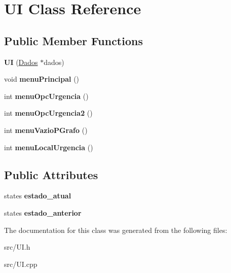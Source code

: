 \hypertarget{class_u_i}{}\section{UI Class Reference}
\label{class_u_i}
\subsection*{Public Member Functions}
\begin{DoxyCompactItemize}
\item 
\hypertarget{class_u_i_ac974e568f70fbc571a1f9c2d6b6cbc86}{}\label{class_u_i_ac974e568f70fbc571a1f9c2d6b6cbc86} 
{\bfseries UI} (\hyperlink{class_dados}{Dados} $\ast$dados)
\item 
\hypertarget{class_u_i_ac8b4237429a4210a48b64c05888c2e59}{}\label{class_u_i_ac8b4237429a4210a48b64c05888c2e59} 
void {\bfseries menu\+Principal} ()
\item 
\hypertarget{class_u_i_a02d83eab2f7cc38dd230f7affae0aab3}{}\label{class_u_i_a02d83eab2f7cc38dd230f7affae0aab3} 
int {\bfseries menu\+Opc\+Urgencia} ()
\item 
\hypertarget{class_u_i_a2fdb860ed265a434142c746cc94ee1fd}{}\label{class_u_i_a2fdb860ed265a434142c746cc94ee1fd} 
int {\bfseries menu\+Opc\+Urgencia2} ()
\item 
\hypertarget{class_u_i_a80d1a83061bbdba52aa2eb119ec900bc}{}\label{class_u_i_a80d1a83061bbdba52aa2eb119ec900bc} 
int {\bfseries menu\+Vazio\+P\+Grafo} ()
\item 
\hypertarget{class_u_i_aaee26714eb729fec00b6ee496e009f3f}{}\label{class_u_i_aaee26714eb729fec00b6ee496e009f3f} 
int {\bfseries menu\+Local\+Urgencia} ()
\end{DoxyCompactItemize}
\subsection*{Public Attributes}
\begin{DoxyCompactItemize}
\item 
\hypertarget{class_u_i_ac2d8ad0b755434f55caea1a87d89ac6d}{}\label{class_u_i_ac2d8ad0b755434f55caea1a87d89ac6d} 
states {\bfseries estado\+\_\+atual}
\item 
\hypertarget{class_u_i_accf4989e37d4423b197ce1bdd5a8d5b9}{}\label{class_u_i_accf4989e37d4423b197ce1bdd5a8d5b9} 
states {\bfseries estado\+\_\+anterior}
\end{DoxyCompactItemize}


The documentation for this class was generated from the following files\+:\begin{DoxyCompactItemize}
\item 
src/U\+I.\+h\item 
src/U\+I.\+cpp\end{DoxyCompactItemize}

